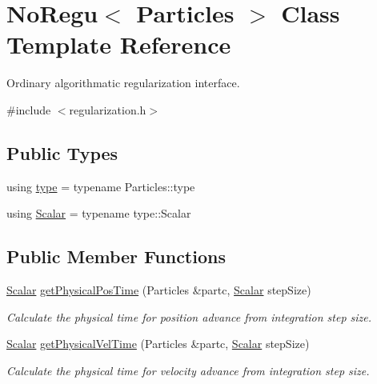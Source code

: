 \hypertarget{class_no_regu}{}\section{No\+Regu$<$ Particles $>$ Class Template Reference}
\label{class_no_regu}


Ordinary algorithmatic regularization interface.  




{\ttfamily \#include $<$regularization.\+h$>$}

\subsection*{Public Types}
\begin{DoxyCompactItemize}
\item 
using \mbox{\hyperlink{class_no_regu_acdfb043f122617376d117cadd040e220}{type}} = typename Particles\+::type
\item 
using \mbox{\hyperlink{class_no_regu_af6597c7ec828f8630895903da9251be4}{Scalar}} = typename type\+::\+Scalar
\end{DoxyCompactItemize}
\subsection*{Public Member Functions}
\begin{DoxyCompactItemize}
\item 
\mbox{\hyperlink{class_no_regu_af6597c7ec828f8630895903da9251be4}{Scalar}} \mbox{\hyperlink{class_no_regu_aeae8b6811fa8b50e0d8cdbd2ae9a0d9c}{get\+Physical\+Pos\+Time}} (Particles \&partc, \mbox{\hyperlink{class_no_regu_af6597c7ec828f8630895903da9251be4}{Scalar}} step\+Size)
\begin{DoxyCompactList}\small\item\em Calculate the physical time for position advance from integration step size. \end{DoxyCompactList}\item 
\mbox{\hyperlink{class_no_regu_af6597c7ec828f8630895903da9251be4}{Scalar}} \mbox{\hyperlink{class_no_regu_aef38cba8fa164bf3dfda2518f770d286}{get\+Physical\+Vel\+Time}} (Particles \&partc, \mbox{\hyperlink{class_no_regu_af6597c7ec828f8630895903da9251be4}{Scalar}} step\+Size)
\begin{DoxyCompactList}\small\item\em Calculate the physical time for velocity advance from integration step size. \end{DoxyCompactList}\end{DoxyCompactItemize}


